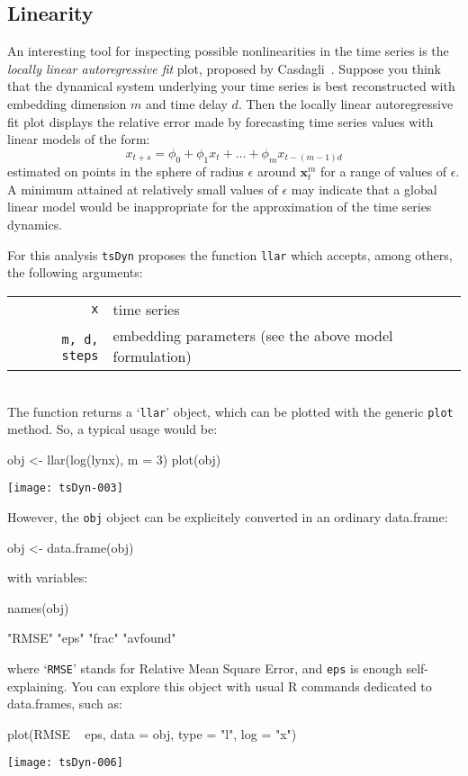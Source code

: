\documentclass[a4paper]{article}
\newcommand{\tsDyn}{\texttt{tsDyn} }
\begin{document}
\subsection{Linearity} An interesting tool for inspecting possible
nonlinearities in the time series is the \emph{locally linear
autoregressive fit} plot, proposed by
Casdagli~\cite{Casdagli1991}. Suppose you think that the dynamical
system underlying your time series is best reconstructed with
embedding dimension $m$ and time delay $d$. Then the locally linear
autoregressive fit plot displays the relative error made by
forecasting time series values with linear models of the form: 
\[x_{t+s} = \phi_0 + \phi_1 x_{t} + \ldots + \phi_m x_{t-(m-1) d} \]
estimated on points in the sphere of radius $\epsilon$ around
$\mathbf{x}^m_t$ for a range of values of $\epsilon$. A minimum
attained at relatively small values of $\epsilon$ may indicate that a
global linear model would be inappropriate for the approximation of
the time series dynamics.  

For this analysis \tsDyn proposes the function \texttt{llar}
which accepts, among others, the following arguments:\\
\begin{tabular}{rl} 
\texttt{x} & time series \\ \
\texttt{m, d, steps} & embedding parameters (see the above model formulation)\\
\end{tabular}\\ 
The function returns a `\texttt{llar}' object, which
can be plotted with the generic \texttt{plot} method. So, a typical
usage would be:\\ 
\begin{Schunk}
\begin{Sinput}
 obj <- llar(log(lynx), m = 3)
 plot(obj)
\end{Sinput}
\end{Schunk}
\texttt{[image: tsDyn-003]}

However, the \texttt{obj} object can be explicitely converted in an ordinary data.frame:
\begin{Schunk}
\begin{Sinput}
 obj <- data.frame(obj)
\end{Sinput}
\end{Schunk}
with variables:
\begin{Schunk}
\begin{Sinput}
 names(obj)
\end{Sinput}
\begin{Soutput}
[1] "RMSE"    "eps"     "frac"    "avfound"
\end{Soutput}
\end{Schunk}
where `\texttt{RMSE}' stands for Relative Mean Square Error, and \texttt{eps} is enough self-explaining. You can explore this object with usual R commands dedicated to data.frames, such as:
\begin{Schunk}
\begin{Sinput}
 plot(RMSE ~ eps, data = obj, type = "l", log = "x")
\end{Sinput}
\end{Schunk}
\texttt{[image: tsDyn-006]}
\end{document}
